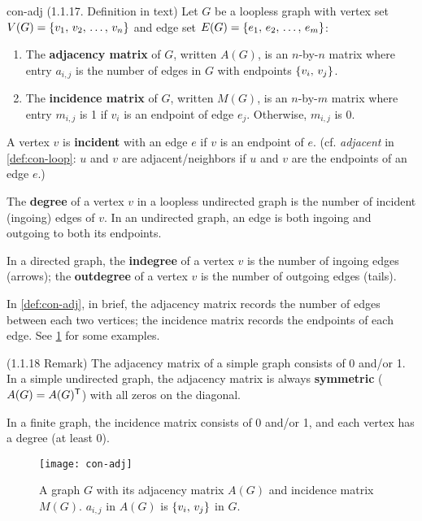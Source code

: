 \documentclass[../src/handouts/main.tex]{subfiles}
\begin{document}
\begin{definition}{}{con-adj}
  (1.1.17. Definition in text)
  Let $G$ be a loopless graph with vertex set $V(G) = \lbrace v_1,\, v_2,\, \ldots,\, v_n\rbrace$ and edge set $E(G) = \lbrace e_1,\, e_2,\, \ldots,\, e_m\rbrace$:

  \begin{enumerate}
    \item The \textbf{adjacency matrix} of $G$, written $A(G)$, is an $n$-by-$n$ matrix where entry $a_{i,j}$ is the number of edges in $G$ with endpoints $\lbrace v_i,\, v_j\rbrace$.
    \item The \textbf{incidence matrix} of $G$, written $M(G)$, is an $n$-by-$m$ matrix where entry $m_{i,j}$ is 1 if $v_i$ is an endpoint of edge $e_j$. Otherwise, $m_{i,j}$ is 0.
  \end{enumerate}

  A vertex $v$ is \textbf{incident} with an edge $e$ if $v$ is an endpoint of $e$. (cf. \textit{adjacent} in \cref{def:con-loop}: $u$ and $v$ are adjacent/neighbors if $u$ and $v$ are the endpoints of an edge $e$.)

  The \textbf{degree} of a vertex $v$ in a loopless undirected graph is the number of incident (ingoing) edges of $v$. In an undirected graph, an edge is both ingoing and outgoing to both its endpoints.

  In a directed graph, the \textbf{indegree} of a vertex $v$ is the number of ingoing edges (arrows); the \textbf{outdegree} of a vertex $v$ is the number of outgoing edges (tails).
\end{definition}

In \cref{def:con-adj}, in brief, the adjacency matrix records the number of edges between each two vertices; the incidence matrix records the endpoints of each edge. See \cref{fig:con-adj} for some examples.

(1.1.18 Remark) The adjacency matrix of a simple graph consists of 0 and/or 1. In a simple undirected graph, the adjacency matrix is always \textbf{symmetric} ($A(G) = A(G)^{\mathsf{T}}$) with all zeros on the diagonal.

In a finite graph, the incidence matrix consists of 0 and/or 1, and each vertex has a degree (at least 0).

\begin{figure}[ht]
  \centering
  \texttt{[image: con-adj]}
  \caption{A graph $G$ with its adjacency matrix $A(G)$ and incidence matrix $M(G)$. $a_{i,j}$ in $A(G)$ is $\lbrace v_i,\, v_j\rbrace$ in $G$.}
  \label{fig:con-adj}
\end{figure}
\end{document}
